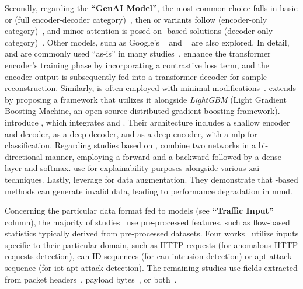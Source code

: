 Secondly, regarding the \textbf{``GenAI Model''}, 
the most common choice falls in basic  or  (\ie full encoder-decoder category)~\cite{li2022extreme, wu2022, ullah2023tnn, wang2023robust, lin2022, guthula2023netfound, ho2022network},
then  or variants follow (\ie encoder-only category)~\cite{yu2021securing, seyyar2022attack, ghourabi2022security, lai2023, ferrag2024, wang2024lightweight, manocchio2024flowtransformer},
and minor attention is posed on -based solutions (\ie decoder-only category)~\cite{nam2021intrusion, ali2023, melicias2024gpt, meng2023netgpt}.
Other models, such as Google's ~\cite{wang2024lens} and ~\cite{wang2024netmamba} are also explored.
In detail, 
 and  are commonly used ``as-is'' in many studies~\cite{li2022extreme, wu2022, ullah2023tnn}. 
\citet{wang2023robust} enhance the transformer encoder's training phase by incorporating a contrastive loss term, and the encoder output is subsequently fed into a transformer decoder for sample reconstruction.
Similarly,  is often employed with minimal modifications~\cite{yu2021securing, seyyar2022attack, lai2023, ferrag2024}. 
\citet{ghourabi2022security} extends  by proposing a framework that utilizes it alongside \emph{LightGBM} (Light Gradient Boosting Machine, an open-source distributed gradient boosting framework).
\citet{manocchio2024flowtransformer} introduce , which integrates  and . Their architecture includes a shallow encoder and decoder,  as a deep decoder, and  as a deep encoder, with a \gls{mlp} for classification.
Regarding studies based on , 
\citet{nam2021intrusion} combine two  networks in a bi-directional manner, employing a forward and a backward  followed by a dense layer and softmax.
\citet{ali2023} use  for explainability purposes alongside various \gls{xai} techniques.
Lastly, \citet{melicias2024gpt} leverage  for data augmentation. They demonstrate that -based methods can generate invalid data, leading to performance degradation in \gls{mmd}.

Concerning the particular data format fed to models (see \textbf{``Traffic Input''} column),
the majority of studies~\cite{ho2022network, wu2022, ghourabi2022security, lai2023, ali2023, ullah2023tnn, wang2023robust, manocchio2024flowtransformer, wang2024lightweight, melicias2024gpt} use pre-processed features, such as flow-based statistics typically derived from pre-processed datasets.
Four works~\cite{nam2021intrusion, yu2021securing, seyyar2022attack} utilize inputs specific to their particular domain, such as
HTTP requests
(for anomalous HTTP requests detection), \gls{can} ID sequences (for \gls{can} intrusion detection) or \gls{apt} attack sequence (for \gls{iot} \gls{apt} attack detection).
The remaining studies use fields extracted from packet headers~\cite{guthula2023netfound, ferrag2024}, payload bytes~\cite{li2022extreme, lin2022, wang2024netmamba}, or both~\cite{meng2023netgpt, wang2024lens}.

